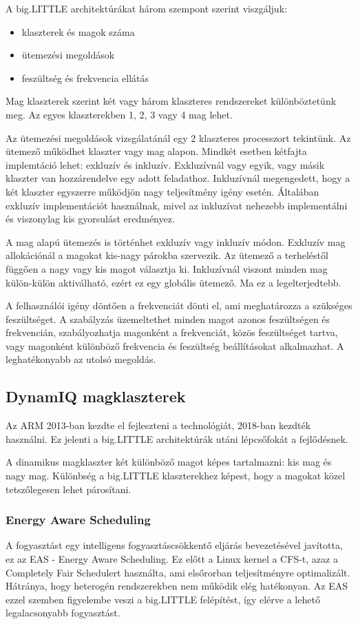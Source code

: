 A big.LITTLE architektúrákat három szempont szerint viszgáljuk:
\begin{itemize}
    \item klaszterek és magok száma
    \item ütemezési megoldások
    \item feszültség és frekvencia ellátás
\end{itemize}

Mag klaszterek szerint két vagy három klaszteres rendszereket különböztetünk meg.
Az egyes klaszterekben 1, 2, 3 vagy 4 mag lehet.

Az ütemezési megoldások vizsgálatánál egy 2 klaszteres processzort tekintünk.
Az ütemező működhet klaszter vagy mag alapon.
Mindkét esetben kétfajta implemtáció lehet: exkluzív és inkluzív.
Exkluzívnál vagy egyik, vagy másik klaszter van hozzárendelve egy adott feladathoz.
Inkluzívnál megengedett, hogy a két klaszter egyszerre működjön nagy teljesítmény igény esetén.
Általában exkluzív implementációt használnak, mivel az inkluzívat nehezebb implementálni és viszonylag kis gyorsulást eredményez.

A mag alapú ütemezés is történhet exkluzív vagy inkluzív módon.
Exkluzív mag allokációnál a magokat kis-nagy párokba szervezik.
Az ütemező a terheléstől függően a nagy vagy kis magot választja ki.
Inkluzívnál viszont minden mag külön-külön aktiválható, ezért ez egy globális ütemező.
Ma ez a legelterjedtebb.

A felhasználói igény döntően a frekvenciát dönti el, ami meghatározza a szükséges feszültséget.
A szabályzás üzemeltethet minden magot azonos feszültségen és frekvencián, szabályozhatja magonként a frekvenciát, közös feszültséget tartva, vagy magonként különböző frekvencia és feszültség beállításokat alkalmazhat.
A leghatékonyabb az utolsó megoldás.

\subsection{DynamIQ magklaszterek}
Az ARM 2013-ban kezdte el fejleszteni a technológiát, 2018-ban kezdték használni.
Ez jelenti a big.LITTLE architektúrák utáni lépcsőfokát a fejlődésnek.

A dinamikus magklaszter két különböző magot képes tartalmazni: kis mag és nagy mag.
Különbség a big.LITTLE klaszterekhez képest, hogy a magokat közel tetszőlegesen lehet párosítani.

\subsubsection{Energy Aware Scheduling}
A fogyasztást egy intelligens fogyasztáscsökkentő eljárás bevezetésével javította, ez az EAS - Energy Aware Scheduling.
Ez előtt a Linux kernel a CFS-t, azaz a Completely Fair Schedulert használta, ami elsőrorban teljesítményre optimalizált.
Hátránya, hogy heterogén rendszerekben nem működik elég hatékonyan.
Az EAS ezzel szemben figyelembe veszi a big.LITTLE felépítést, így elérve a lehető legalacsonyabb fogyasztást.

